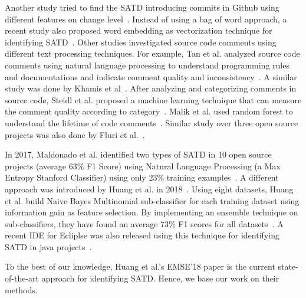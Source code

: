 \documentclass[10pt,conference]{IEEEtran}
\newcommand{\bi}{\begin{itemize}}
\newcommand{\ei}{\end{itemize}}
\begin{document}
Another study tried to find the SATD introducing commits in Github using different features on change level~\cite{yan2018automating}. 
Instead of using a bag of word approach, a recent study also proposed word embedding as vectorization technique for identifying SATD~\cite{flisar2018enhanced}. 
Other studies investigated source code comments using different text processing techniques. 
For example, Tan et al. analyzed source code comments using natural language processing to understand programming rules and documentations and indicate comment quality and inconsistency~\cite{tan2007icomment,tan2012tcomment}. 
A similar study was done by Khamis et al~\cite{khamis2010automatic}. 
After analyzing and categorizing comments in source code, Steidl et al. proposed a machine learning technique that can measure the comment quality according to category~\cite{steidl2013quality}. 
Malik et al. used random forest to understand the lifetime of code comments~\cite{malik2008understanding}. 
Similar study over three open source projects was also done by Fluri et al.~\cite{fluri2007code}. 


In 2017, Maldonado et al.   identified two types of SATD in 10 open source projects (average 63\% F1 Score) using Natural Language Processing (a Max Entropy Stanford Classifier) using only 23\% training examples~\cite{maldonado2017using}. 
A different approach was introduced by Huang et al. in 2018~\cite{huang2018identifying}. 
Using eight datasets, Huang et al. 
build Naive Bayes Multinomial sub-classifier for each training dataset using information gain as feature selection.
By implementing an ensemble technique on sub-classifiers, they have found an average 73\% F1 scores for all datasets~\cite{huang2018identifying}. 
A recent IDE for Ecliplse was also released using this technique for identifying SATD in java projects~\cite{liu2018satd}.

  To the best of our knowledge,  Huang et al.'s EMSE'18 paper
is the current state-of-the-art approach for 
identifying SATD.  Hence, we base our work
on their methods.
\end{document}
